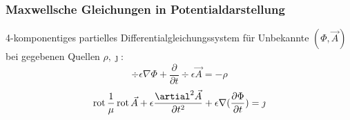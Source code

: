 \documentclass[english]{latex4ei/latex4ei_sheet}
\begin{document}
\subsubsection{Maxwellsche Gleichungen in Potentialdarstellung}
4-komponentiges partielles Differentialgleichungssystem f\"ur Unbekannte $(\Phi,\vec{A})$ bei gegebenen Quellen $\rho,\jmath$:
\[\div{\epsilon \nabla \Phi}+\frac{\partial}{\partial t} \div{\epsilon \vec{A}}=-\rho\]
\[\rot{\frac{1}{\mu}\rot{\vec{A}}+\epsilon \frac{\artial^2 \vec{A}}{\partial t^2}}+\epsilon \nabla(\frac{\partial \Phi}{\partial t})=\jmath\]
\end{document}
